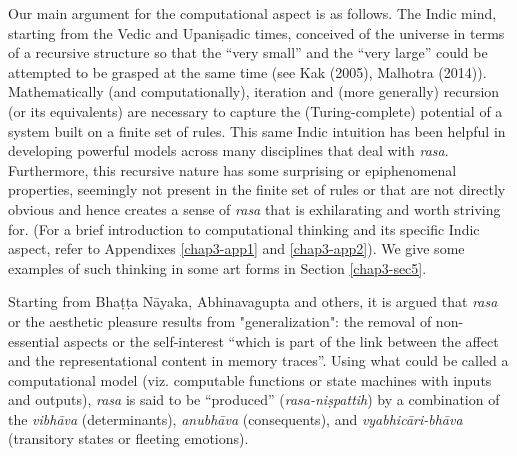 Our main argument for the computational aspect is as follows. The Indic mind, starting from the Vedic and Upaniṣadic times, conceived of the universe in terms of a recursive structure so that the “very small” and the “very large” could be attempted to be grasped at the same time (see Kak (2005), Malhotra (2014)). Mathematically (and computationally), iteration and (more generally) recursion (or its equivalents) are necessary to capture the (Turing-complete) potential of a system built on a finite set of rules. This same Indic intuition has been helpful in developing powerful models across many disciplines that deal with \textsl{rasa}. Furthermore, this recursive nature has some surprising or epiphenomenal properties, seemingly not present in the finite set of rules or that are not directly obvious and hence creates a sense of \textsl{rasa} that is exhilarating and worth striving for. (For a brief introduction to computational thinking and its specific Indic aspect, refer to Appendixes \ref{chap3-app1} and \ref{chap3-app2}). We give some examples of such thinking in some art forms in Section \ref{chap3-sec5}.

Starting from Bhaṭṭa Nāyaka, Abhinavagupta and others, it is argued that \textsl{rasa} or the aesthetic pleasure results from "generalization": the removal of non-essential aspects or the self-interest “which is part of the link between the affect and the representational content in memory traces”. Using what could be called a computational model (viz. computable functions or state machines with inputs and outputs), \textsl{rasa} is said to be “produced” (\textsl{rasa-niṣpattih}) by a combination of the \textsl{vibhāva} (determinants), \textsl{anubhāva} (consequents), and \textsl{vyabhicāri-bhāva} (transitory states or fleeting emotions). 

